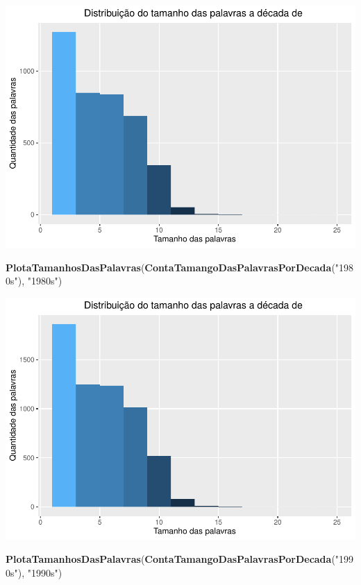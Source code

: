 \documentclass[]{article}
\newenvironment{Shaded}{\begin{snugshade}}{\end{snugshade}}
\newcommand{\KeywordTok}[1]{\textcolor[rgb]{0.13,0.29,0.53}{\textbf{#1}}}
\newcommand{\NormalTok}[1]{#1}
\newcommand{\StringTok}[1]{\textcolor[rgb]{0.31,0.60,0.02}{#1}}
\begin{document}
\includegraphics{avaliacaoLetrasDeForro_files/figure-latex/unnamed-chunk-8-3.pdf}

\begin{Shaded}
\begin{Highlighting}[]
\KeywordTok{PlotaTamanhosDasPalavras}\NormalTok{(}\KeywordTok{ContaTamangoDasPalavrasPorDecada}\NormalTok{(}\StringTok{"1980s"}\NormalTok{), }\StringTok{"1980s"}\NormalTok{)}
\end{Highlighting}
\end{Shaded}

\includegraphics{avaliacaoLetrasDeForro_files/figure-latex/unnamed-chunk-8-4.pdf}

\begin{Shaded}
\begin{Highlighting}[]
\KeywordTok{PlotaTamanhosDasPalavras}\NormalTok{(}\KeywordTok{ContaTamangoDasPalavrasPorDecada}\NormalTok{(}\StringTok{"1990s"}\NormalTok{), }\StringTok{"1990s"}\NormalTok{)}
\end{Highlighting}
\end{Shaded}
\end{document}
